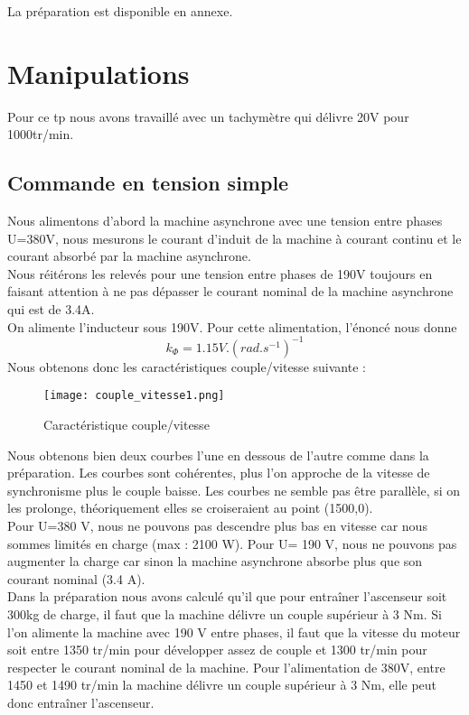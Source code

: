 \documentclass[oneside,a4paper,12pt]{article}
\begin{document}
	La préparation est disponible en annexe.
	
	\section{Manipulations}
	
	Pour ce tp nous avons travaillé avec un tachymètre qui délivre 20V pour 1000tr/min.\\
	
	\subsection{Commande en tension simple}
	
	Nous alimentons d’abord la machine asynchrone avec une tension entre phases U=380V, nous mesurons le courant d’induit de la machine à courant continu et le courant absorbé par la machine asynchrone.\\
	Nous réitérons les relevés pour une tension entre phases de 190V toujours en faisant attention à ne pas dépasser le courant nominal de la machine asynchrone qui est de 3.4A.\\
	On alimente l’inducteur sous 190V. Pour cette alimentation, l’énoncé nous donne 
	$$ k_{\Phi}=1.15 V.(rad.s^{-1})^{-1}$$
	Nous obtenons donc les caractéristiques couple/vitesse suivante : \\
	
	\begin{figure}[h]
		\centering
		\texttt{[image: couple\_vitesse1.png]}
		\caption{Caractéristique couple/vitesse}
	\end{figure}
	
	Nous obtenons bien deux courbes l’une en dessous de l’autre comme dans la préparation. Les courbes sont cohérentes, plus l’on approche de la vitesse de synchronisme plus le couple baisse. Les courbes ne semble pas être parallèle, si on les prolonge, théoriquement elles se croiseraient au point (1500,0).\\
	Pour  U=380 V, nous ne pouvons pas descendre plus bas en vitesse car nous sommes limités en charge (max : 2100 W). Pour U= 190 V, nous ne pouvons pas augmenter la charge car sinon la machine asynchrone absorbe plus que son courant nominal (3.4 A).\\
	Dans la préparation nous avons calculé qu’il que pour entraîner l’ascenseur soit 300kg de charge, il faut que la machine délivre un couple supérieur à 3 Nm. Si l’on alimente la machine avec 190 V entre phases, il faut que la vitesse du moteur soit entre 1350 tr/min pour développer assez de couple et 1300 tr/min pour respecter le courant nominal de la machine. Pour l’alimentation de 380V, entre 1450 et 1490 tr/min la machine délivre un couple supérieur à 3 Nm, elle peut donc entraîner l’ascenseur.\\
	
\end{document}
